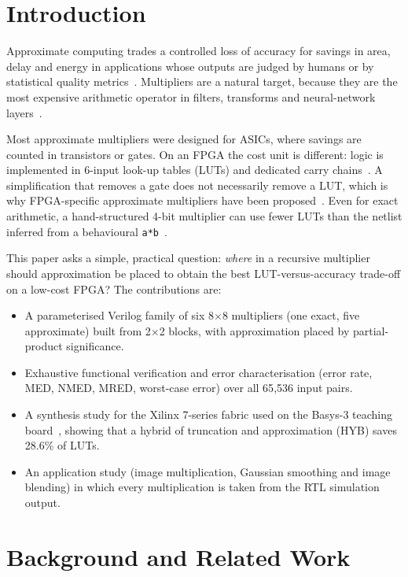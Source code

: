 \documentclass[conference]{IEEEtran}
\begin{document}
\section{Introduction}
Approximate computing trades a controlled loss of accuracy for savings in area, delay and energy in applications whose outputs are judged by humans or by statistical quality metrics~\cite{han2013approximate,mittal2016survey}. Multipliers are a natural target, because they are the most expensive arithmetic operator in filters, transforms and neural-network layers~\cite{jiang2020survey}.

Most approximate multipliers were designed for ASICs, where savings are counted in transistors or gates. On an FPGA the cost unit is different: logic is implemented in 6-input look-up tables (LUTs) and dedicated carry chains~\cite{ug474}. A simplification that removes a gate does not necessarily remove a LUT, which is why FPGA-specific approximate multipliers have been proposed~\cite{ullah2022fpga,vakili2024dyrecmul}. Even for exact arithmetic, a hand-structured 4-bit multiplier can use fewer LUTs than the netlist inferred from a behavioural \texttt{a*b}~\cite{kida2025fourbit}.

This paper asks a simple, practical question: \emph{where} in a recursive multiplier should approximation be placed to obtain the best LUT-versus-accuracy trade-off on a low-cost FPGA? The contributions are:
\begin{itemize}
\item A parameterised Verilog family of six 8$\times$8 multipliers (one exact, five approximate) built from 2$\times$2 blocks, with approximation placed by partial-product significance.
\item Exhaustive functional verification and error characterisation (error rate, MED, NMED, MRED, worst-case error) over all 65{,}536 input pairs.
\item A synthesis study for the Xilinx 7-series fabric used on the Basys-3 teaching board~\cite{basys3rm}, showing that a hybrid of truncation and approximation (HYB) saves 28.6\% of LUTs.
\item An application study (image multiplication, Gaussian smoothing and image blending) in which every multiplication is taken from the RTL simulation output.
\end{itemize}

\section{Background and Related Work}
\end{document}
